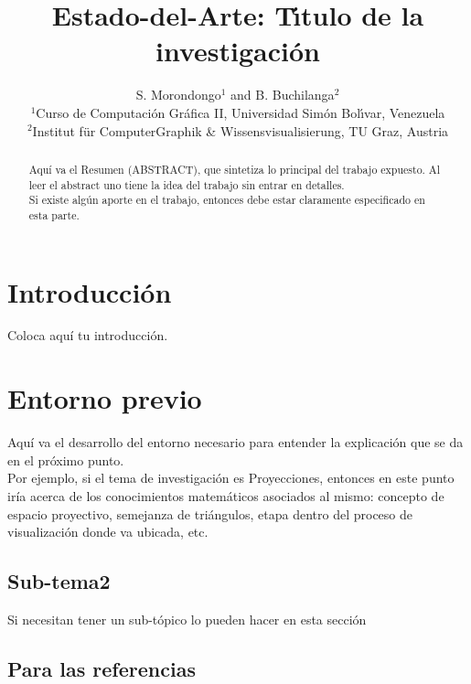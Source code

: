 \documentclass{cgusb}
\title[Estado-del-Arte: T\'{\i}tulo Corto]%
      {Estado-del-Arte: T\'{\i}tulo de la investigación}
\author[Songo Morondongo \& Benab{é} Buchilanga]
       {S. Morondongo$^{1}$
        and B. Buchilanga$^{2}$
        \\
         $^1$Curso de Computación Gráfica II, Universidad Simón Bol\'{\i}var, Venezuela\\
         $^2$Institut f{\"u}r ComputerGraphik \& Wissensvisualisierung, TU Graz, Austria
       }
\numberwithin{equation}{section} %
\begin{document}
\maketitle

\begin{abstract}
	Aquí va el Resumen (ABSTRACT), que sintetiza lo principal del trabajo
	expuesto. Al leer el abstract uno tiene la idea del trabajo 
	sin entrar en detalles.\\
	Si existe algún aporte en el trabajo, entonces debe estar 
	claramente especificado en esta parte.
\begin{keywords} %
\end{keywords}

\end{abstract}


\section{Introducción}
\label{sec:intro}
Coloca aquí tu introducción.

\section{Entorno previo}
\label{sec:review}
Aquí va el desarrollo del entorno necesario para entender la explicación que se da en el próximo punto.\\
Por ejemplo, si el tema de investigación es Proyecciones, entonces en este punto iría acerca de 
los conocimientos matemáticos asociados al mismo: concepto de espacio proyectivo, semejanza de triángulos,
 etapa dentro del proceso de visualización donde va ubicada, etc.

\subsection{Sub-tema2}
\label{subsec:tema1}

 Si necesitan tener un sub-tópico lo pueden hacer en esta sección

\subsection{Para las referencias}
\label{subsec:tema2}
\end{document}
